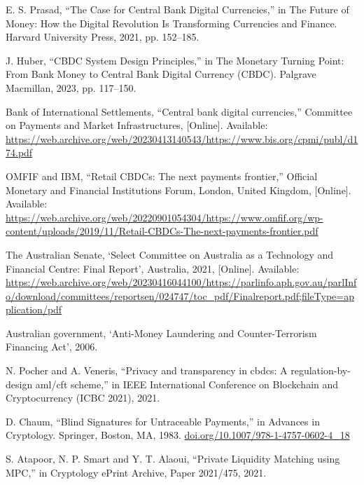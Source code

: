 \begin{enumerate}[leftmargin=0.75cm,label={[\arabic*]}]
  \item E. S. Prasad, ``The Case for Central Bank Digital Currencies,'' in The Future of Money: How the Digital Revolution Is Transforming Currencies and Finance. Harvard University Press, 2021, pp. 152–185.

  \item   J. Huber, ``CBDC System Design Principles,'' in The Monetary Turning Point: From Bank Money to Central Bank Digital Currency (CBDC). Palgrave Macmillan, 2023, pp. 117–150.


  \item Bank of International Settlements, ``Central bank digital currencies,'' Committee on Payments and Market Infrastructures, [Online]. Available: \url{https://web.archive.org/web/20230413140543/https://www.bis.org/cpmi/publ/d174.pdf}

  \item OMFIF and IBM, ``Retail CBDCs: The next payments frontier,'' Official Monetary and Financial Institutions Forum, London, United Kingdom, [Online]. Available: \url{https://web.archive.org/web/20220901054304/https://www.omfif.org/wp-content/uploads/2019/11/Retail-CBDCs-The-next-payments-frontier.pdf}

  
  \item The Australian Senate, `Select Committee on Australia as a Technology and Financial Centre: Final Report', Australia, 2021, [Online]. Available: \url{https://web.archive.org/web/20230416044100/https://parlinfo.aph.gov.au/parlInfo/download/committees/reportsen/024747/toc\_pdf/Finalreport.pdf;fileType=application/pdf}

  \item Australian government, `Anti-Money Laundering and Counter-Terrorism Financing Act', 2006.


  \item N. Pocher and A. Veneris, ``Privacy and transparency in cbdcs: A regulation-by-design aml/cft scheme,'' in IEEE International Conference on Blockchain and Cryptocurrency (ICBC 2021), 2021.


  \item D. Chaum, ``Blind Signatures for Untraceable Payments,'' in Advances in Cryptology. Springer, Boston, MA, 1983. \url{doi.org/10.1007/978-1-4757-0602-4_18}


  \item S. Atapoor, N. P. Smart and Y. T. Alaoui, ``Private Liquidity Matching using MPC,'' in Cryptology ePrint Archive, Paper 2021/475, 2021.


\end{enumerate}
